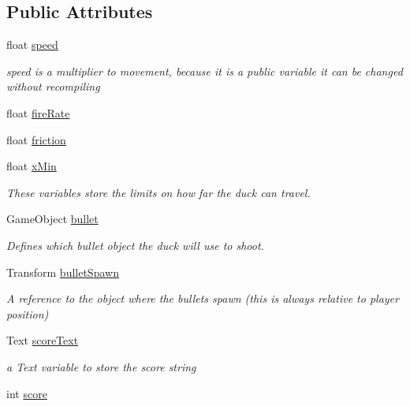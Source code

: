 \subsection*{Public Attributes}
\begin{DoxyCompactItemize}
\item 
float \mbox{\hyperlink{class_player_controller_a0928605583f0563cd84fe43119d336ec}{speed}}
\begin{DoxyCompactList}\small\item\em speed is a multiplier to movement, because it is a public variable it can be changed without recompiling \end{DoxyCompactList}\item 
float \mbox{\hyperlink{class_player_controller_aec1e8f25c69ea198fe38f965307437a4}{fire\+Rate}}
\item 
float \mbox{\hyperlink{class_player_controller_a22510e0221512fb7fe06808912fa1a55}{friction}}
\item 
float \mbox{\hyperlink{class_player_controller_a373cbc1dfe44cb185a84422b4a56bf9b}{x\+Min}}
\begin{DoxyCompactList}\small\item\em These variables store the limits on how far the duck can travel. \end{DoxyCompactList}\item 
Game\+Object \mbox{\hyperlink{class_player_controller_a47d9b8f67993f190c8f170bc3f134ee6}{bullet}}
\begin{DoxyCompactList}\small\item\em Defines which bullet object the duck will use to shoot. \end{DoxyCompactList}\item 
Transform \mbox{\hyperlink{class_player_controller_a45263a41dbdfe88658e0b58196aeba98}{bullet\+Spawn}}
\begin{DoxyCompactList}\small\item\em A reference to the object where the bullets spawn (this is always relative to player position) \end{DoxyCompactList}\item 
Text \mbox{\hyperlink{class_player_controller_a8f1361a4354591db4e79c4e6609e0a88}{score\+Text}}
\begin{DoxyCompactList}\small\item\em a Text variable to store the score string \end{DoxyCompactList}\item 
int \mbox{\hyperlink{class_player_controller_ac4f30954818a6c7d0e344721a0342fec}{score}}

\end{DoxyCompactItemize}
